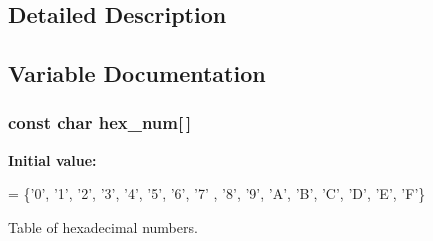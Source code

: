 \subsection{Detailed Description}


\subsection{Variable Documentation}
\subsubsection[{\texorpdfstring{hex\+\_\+num}{hex_num}}]{\setlength{\rightskip}{0pt plus 5cm}const char hex\+\_\+num\mbox{[}$\,$\mbox{]}\hspace{0.3cm}{\ttfamily [static]}}\hypertarget{group___k_n_x___aux___private___consts_ga938e545954f0ddfa9a048c6fc3f30776}{}\label{group___k_n_x___aux___private___consts_ga938e545954f0ddfa9a048c6fc3f30776}
{\bfseries Initial value\+:}
\begin{DoxyCode}
= \{\textcolor{charliteral}{'0'}, \textcolor{charliteral}{'1'}, \textcolor{charliteral}{'2'}, \textcolor{charliteral}{'3'}, \textcolor{charliteral}{'4'}, \textcolor{charliteral}{'5'}, \textcolor{charliteral}{'6'}, \textcolor{charliteral}{'7'} , \textcolor{charliteral}{'8'}, \textcolor{charliteral}{'9'},
                                \textcolor{charliteral}{'A'}, \textcolor{charliteral}{'B'}, \textcolor{charliteral}{'C'}, \textcolor{charliteral}{'D'}, \textcolor{charliteral}{'E'}, \textcolor{charliteral}{'F'}\}
\end{DoxyCode}


Table of hexadecimal numbers. 

